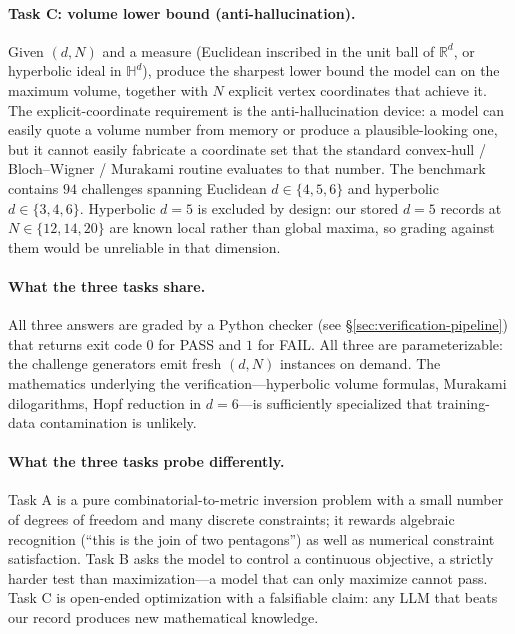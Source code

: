 \documentclass[11pt]{article}
\begin{document}
\paragraph{Task C: volume lower bound (anti-hallucination).}
Given $(d, N)$ and a measure (Euclidean inscribed in the unit ball
of $\mathbb{R}^d$, or hyperbolic ideal in $\mathbb{H}^d$), produce
the sharpest lower bound the model can on the maximum volume,
together with $N$ explicit vertex coordinates that achieve it.  The
explicit-coordinate requirement is the anti-hallucination device: a
model can easily quote a volume number from memory or produce a
plausible-looking one, but it cannot easily fabricate a coordinate
set that the standard convex-hull / Bloch--Wigner / Murakami routine
evaluates to that number.  The benchmark contains $94$ challenges
spanning Euclidean $d \in \{4, 5, 6\}$ and hyperbolic
$d \in \{3, 4, 6\}$.  Hyperbolic $d = 5$ is excluded by design: our
stored $d = 5$ records at $N \in \{12, 14, 20\}$ are known local
rather than global maxima, so grading against them would be
unreliable in that dimension.

\paragraph{What the three tasks share.}
All three answers are graded by a Python checker (see
\S\ref{sec:verification-pipeline}) that returns exit code $0$ for
PASS and $1$ for FAIL.  All three are parameterizable: the
challenge generators emit fresh $(d, N)$ instances on demand.
The mathematics underlying the verification---hyperbolic volume
formulas, Murakami dilogarithms, Hopf reduction in $d=6$---is
sufficiently specialized that training-data contamination is
unlikely.

\paragraph{What the three tasks probe differently.}
Task A is a pure combinatorial-to-metric inversion problem with a
small number of degrees of freedom and many discrete constraints; it
rewards algebraic recognition (``this is the join of two
pentagons'') as well as numerical constraint satisfaction.  Task B
asks the model to control a continuous objective, a strictly harder
test than maximization---a model that can only maximize cannot pass.
Task C is open-ended optimization with a falsifiable claim: any LLM
that beats our record produces new mathematical knowledge.

\end{document}
